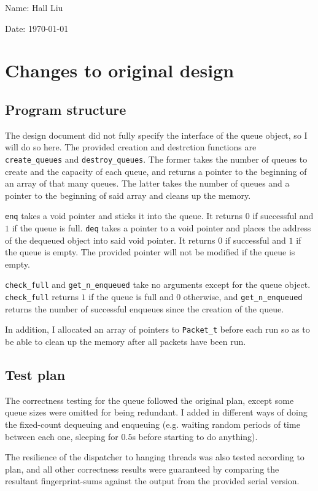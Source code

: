 \documentclass{article}
\begin{document}
Name: Hall Liu

Date: \today 
\vspace{20pt}

\section*{Changes to original design}
\subsection*{Program structure}
The design document did not fully specify the interface of the queue object, so I will do so here. The provided creation and destrction functions are \verb|create_queues| and \verb|destroy_queues|. The former takes the number of queues to create and the capacity of each queue, and returns a pointer to the beginning of an array of that many queues. The latter takes the number of queues and a pointer to the beginning of said array and cleans up the memory.

\verb|enq| takes a void pointer and sticks it into the queue. It returns $0$ if successful and $1$ if the queue is full. \verb|deq| takes a pointer to a void pointer and places the address of the dequeued object into said void pointer. It returns $0$ if successful and $1$ if the queue is empty. The provided pointer will not be modified if the queue is empty.

\verb|check_full| and \verb|get_n_enqueued| take no arguments except for the queue object. \verb|check_full| returns $1$ if the queue is full and $0$ otherwise, and \verb|get_n_enqueued| returns the number of successful enqueues since the creation of the queue.

In addition, I allocated an array of pointers to \verb|Packet_t| before each run so as to be able to clean up the memory after all packets have been run. 
\subsection*{Test plan}
The correctness testing for the queue followed the original plan, except some queue sizes were omitted for being redundant. I added in different ways of doing the fixed-count dequeuing and enqueuing (e.g. waiting random periods of time between each one, sleeping for $0.5$s before starting to do anything).

The resilience of the dispatcher to hanging threads was also tested according to plan, and all other correctness results were guaranteed by comparing the resultant fingerprint-sums against the output from the provided serial version.
\end{document}
